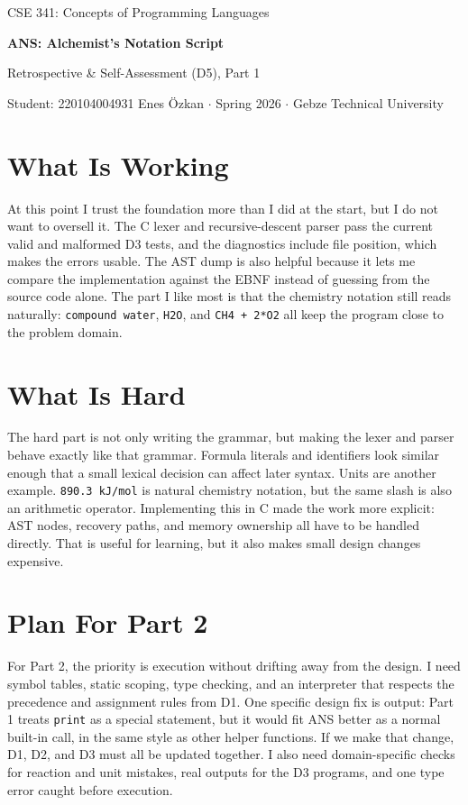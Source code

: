 \documentclass[11pt,a4paper]{article}
\newcommand{\code}[1]{\texttt{#1}}
\begin{document}
\begin{center}
  {\footnotesize\color{anscaption}CSE 341: Concepts of Programming Languages\par}
  \vspace{3pt}
  {\huge\bfseries\sffamily ANS: Alchemist's Notation Script\par}
  \vspace{4pt}
  {\large Retrospective \& Self-Assessment (D5), Part 1\par}
  \vspace{6pt}
  {\footnotesize\color{anscaption}
    Student: 220104004931 Enes Özkan \(\cdot\)
    Spring 2026 \(\cdot\)
    Gebze Technical University\par}
\end{center}
\vspace{7pt}

\section{What Is Working}

At this point I trust the foundation more than I did at the start, but I do not want to oversell it. The C
lexer and recursive-descent parser pass the current valid and malformed D3 tests, and the diagnostics include
file position, which makes the errors usable. The AST dump is also helpful because it lets me compare the
implementation against the EBNF instead of guessing from the source code alone. The part I like most is that
the chemistry notation still reads naturally: \code{compound water}, \code{H2O}, and \code{CH4 + 2*O2}
all keep the program close to the problem domain.

\section{What Is Hard}

The hard part is not only writing the grammar, but making the lexer and parser behave exactly like that
grammar. Formula literals and identifiers look similar enough that a small lexical decision can affect later
syntax. Units are another example. \code{890.3 kJ/mol} is natural chemistry notation, but the same slash is
also an arithmetic operator. Implementing this in C made the work more explicit: AST nodes, recovery paths,
and memory ownership all have to be handled directly. That is useful for learning, but it also makes small
design changes expensive.

\section{Plan For Part 2}

For Part 2, the priority is execution without drifting away from the design. I need symbol tables, static
scoping, type checking, and an interpreter that respects the precedence and assignment rules from D1. One
specific design fix is output: Part 1 treats \code{print} as a special statement, but it would fit ANS better as
a normal built-in call, in the same style as other helper functions. If we make that change, D1, D2, and D3
must all be updated together. I also need domain-specific checks for reaction and unit mistakes, real outputs
for the D3 programs, and one type error caught before execution.
\end{document}
